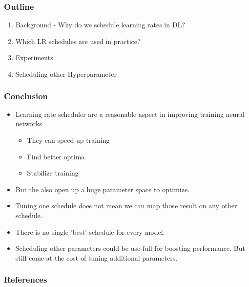 \documentclass[10pt,aspectratio=169]{beamer}
\begin{document}
    \begin{darkframe}
        \frametitle{Outline}
        \begin{enumerate}
            \item Background - Why do we schedule learning rates in DL?
            \item Which LR schedules are used in practice?
            \item Experiments
            \item Scheduling other Hyperparameter
        \end{enumerate}
    \end{darkframe}

    \begin{frame}
        \frametitle{Conclusion}
        \begin{itemize}
            \item Learning rate scheduler are a reasonable aspect in improving training neural networks
            \begin{itemize}
                \item They can speed up training
                \item Find better optima
                \item Stabilize training
            \end{itemize}
            \item But the also open up a huge parameter space to optimize.
            \item Tuning one schedule does not mean we can map those result on any other schedule.
            \item There is no single 'best' schedule for every model.
            \item Scheduling other parameters could be use-full for boosting performance. But still come at the cost of tuning additional parameters. 
        \end{itemize}
        
    
    \end{frame}

    \begin{frame}[allowframebreaks]
        \frametitle{References}
        \printbibliography        
    \end{frame}
\end{document}
